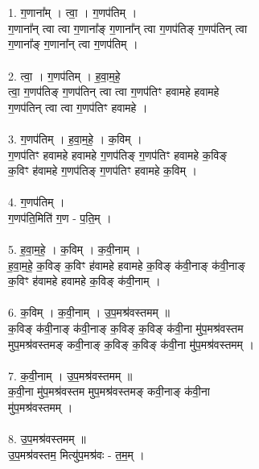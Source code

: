 \section{}
\subsection{}
1. ग॒णाना᳚म् । त्वा॒ । ग॒णप॑तिम् ।\\
ग॒णाना᳚न् त्वा त्वा ग॒णाना᳚ङ् ग॒णाना᳚न् त्वा ग॒णप॑तिङ् ग॒णप॑तिन् त्वा\\
ग॒णाना᳚ङ् ग॒णाना᳚न् त्वा ग॒णप॑तिम् ।\\
\\
2. त्वा॒ । ग॒णप॑तिम् । ह॒वा॒म॒हे॒ \\
त्वा॒ ग॒णप॑तिङ् ग॒णप॑तिन् त्वा त्वा ग॒णप॑तिꣳ हवामहे हवामहे\\
ग॒णप॑तिन् त्वा त्वा ग॒णप॑तिꣳ हवामहे ।\\
\\
3. ग॒णप॑तिम् । ह॒वा॒म॒हे॒ । क॒विम् ।\\
ग॒णप॑तिꣳ हवामहे हवामहे ग॒णप॑तिङ् ग॒णप॑तिꣳ हवामहे क॒विङ्\\
क॒विꣳ ह॑वामहे ग॒णप॑तिङ् ग॒णप॑तिꣳ हवामहे क॒विम् ।\\
\\
4. ग॒णप॑तिम् ।\\
ग॒णप॑ति॒मिति॑ ग॒ण - प॒ति॒म् ।\\
\\
5. ह॒वा॒म॒हे॒ । क॒विम् । क॒वी॒नाम् ।\\
ह॒वा॒म॒हे॒ क॒विङ् क॒विꣳ ह॑वामहे हवामहे क॒विङ् क॑वी॒नाङ् क॑वी॒नाङ्\\
क॒विꣳ ह॑वामहे हवामहे क॒विङ् क॑वी॒नाम् ।\\
\\
6. क॒विम् । क॒वी॒नाम् । उ॒प॒मश्र॑वस्तमम् ॥\\
क॒विङ् क॑वी॒नाङ् क॑वी॒नाङ् क॒विङ् क॒विङ् क॑वी॒ना मु॑प॒मश्र॑वस्तम\\
मुप॒मश्र॑वस्तमङ् कवी॒नाङ् क॒विङ् क॒विङ् क॑वी॒ना मु॑प॒मश्र॑वस्तमम् ।\\
\\
7. क॒वी॒नाम् । उ॒प॒मश्र॑वस्तमम् ॥\\
क॒वी॒ना मु॑प॒मश्र॑वस्तम मुप॒मश्र॑वस्तमङ् कवी॒नाङ् क॑वी॒ना\\
मु॑प॒मश्र॑वस्तमम् ।\\
\\
8. उ॒प॒मश्र॑वस्तमम् ॥\\
उ॒प॒मश्र॑वस्तम॒ मित्यु॑प॒मश्र॑वः - त॒म॒म् ।\\
\\
